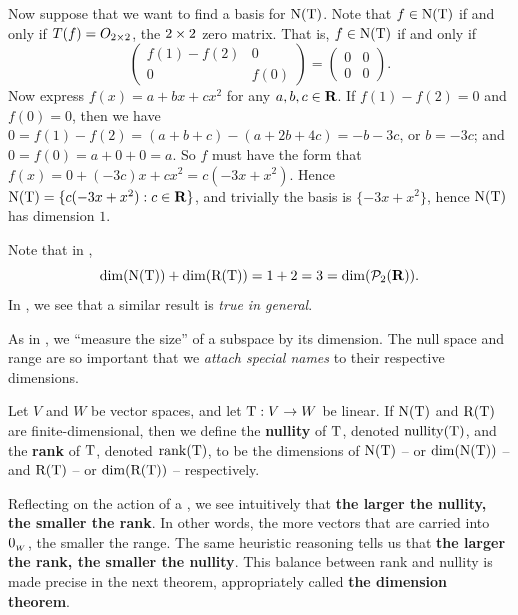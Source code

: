 \begin{example}
Now suppose that we want to find a basis for \(\mathrm{N(T)}\).
Note that \(f \in \mathrm{N(T)}\) if and only if \(T(f) = O_{2 \times 2}\), the \(2 \times 2\) zero matrix.
That is, \(f \in \mathrm{N(T)}\) if and only if
\[
    \begin{pmatrix}
        f(1) - f(2) & 0 \\
        0 & f(0)
    \end{pmatrix}
    = \begin{pmatrix}
        0 & 0 \\
        0 & 0
    \end{pmatrix}.
\]
Now express \(f(x) = a + bx + cx^2\) for any \(a, b, c \in \mathbf{R}\).
If \(f(1) - f(2) = 0\) and \(f(0) = 0\), then we have \(0 = f(1) - f(2) = (a + b + c) - (a + 2b + 4c) = -b - 3c\), or \(b = -3c\);
and \(0 = f(0) = a + 0 + 0 = a\).
So \(f\) must have the form that \(f(x) = 0 + (-3c) x + c x^2 = c(-3x + x^2)\).
Hence \(\mathrm{N(T)} = \{ c(-3x + x^2) : c \in \mathbf{R} \}\), and trivially the basis is \(\{ -3x + x^2 \}\), hence \(\mathrm{N(T)}\) has dimension \(1\).
\end{example}

\begin{remark} \label{remark 2.1.6}
Note that in ,
\[
    \dim(\mathrm{N(T)}) + \dim(\mathrm{R(T)}) = 1 + 2 = 3 = \dim(\mathcal{P}_2(\mathbf{R})).
\]
In , we see that a similar result is \emph{true in general}.
\end{remark}

As in , we ``measure the size'' of a subspace by its dimension.
The null space and range are so important that we \emph{attach special names} to their respective dimensions.

\begin{definition} \label{def 2.3}
Let \(V\) and \(W\) be vector spaces, and let \(\mathrm{T} : V \to W\) be linear.
If \(\mathrm{N(T)}\) and \(\mathrm{R(T)}\) are finite-dimensional, then we define the \textbf{nullity} of \(\mathrm{T}\), denoted \(\mathrm{nullity}(\mathrm{T})\), and the \textbf{rank} of \(\mathrm{T}\), denoted \(\mathrm{rank}(\mathrm{T})\),
to be the dimensions of \(\mathrm{N(T)}\) -- or \(\dim(\mathrm{N(T)})\) -- and \(\mathrm{R(T)}\) -- or \(\dim(\mathrm{R(T)})\) -- respectively.
\end{definition}

\begin{remark} \label{remark 2.1.7}
Reflecting on the action of a \LTRAN{}, we see intuitively that \textbf{the larger the nullity, the smaller the rank}.
In other words, the more vectors that are carried into \(0_{_W}\), the smaller the range.
The same heuristic reasoning tells us that \textbf{the larger the rank, the smaller the nullity}.
This balance between rank and nullity is made precise in the next theorem, appropriately called \textbf{the dimension theorem}.
\end{remark}

